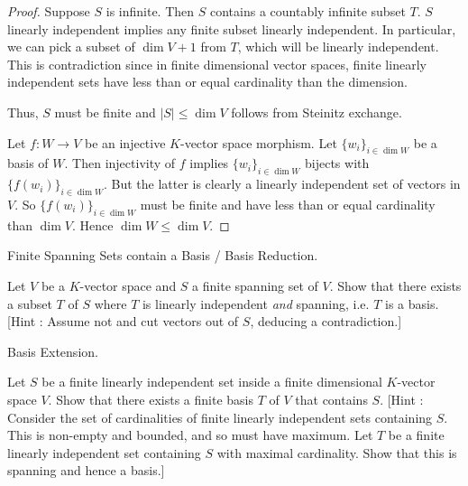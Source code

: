 \documentclass[../../book.tex]{subfiles}
\begin{document}
\begin{proof}
    Suppose $S$ is infinite. Then $S$ contains a countably infinite subset $T$.
    $S$ linearly independent implies any finite subset linearly independent.
    In particular, we can pick a subset of $\dim V + 1$ from $T$,
    which will be linearly independent. 
    This is contradiction since in finite dimensional vector spaces,
    finite linearly independent sets 
    have less than or equal cardinality than the dimension.
    
    Thus, $S$ must be finite and $|S| \leq \dim V$ follows from Steinitz exchange.
    
    Let $f : W \to V$ be an injective $K$-vector space morphism. 
    Let $\{w_i\}_{i\in\dim W}$ be a basis of $W$. 
    Then injectivity of $f$ implies $\{w_i\}_{i\in\dim W}$ bijects with
    $\{f(w_i)\}_{i\in\dim W}$.
    But the latter is clearly a linearly independent set of vectors in $V$.
    So $\{f(w_i)\}_{i\in\dim W}$ must be finite and 
    have less than or equal cardinality than $\dim V$.
    Hence $\dim W \leq \dim V$. 
\end{proof}

\begin{ex} Finite Spanning Sets contain a Basis / Basis Reduction. 
    
    Let $V$ be a $K$-vector space and 
    $S$ a finite spanning set of $V$. 
    Show that there exists a subset $T$ of $S$ where 
    $T$ is linearly independent \emph{and} spanning, 
    i.e. $T$ is a basis. 
    [Hint : Assume not and cut vectors out of $S$, deducing a contradiction.]

\end{ex}

\begin{ex} Basis Extension.
    
    Let $S$ be a finite linearly independent set
    inside a finite dimensional $K$-vector space $V$. 
    Show that there exists a finite basis $T$ of $V$
    that contains $S$.
    [Hint : Consider the set of cardinalities 
    of finite linearly independent sets containing $S$.
    This is non-empty and bounded, and so must have maximum. 
    Let $T$ be a finite linearly independent set containing $S$
    with maximal cardinality.
    Show that this is spanning and hence a basis.]
\end{ex}
\end{document}
